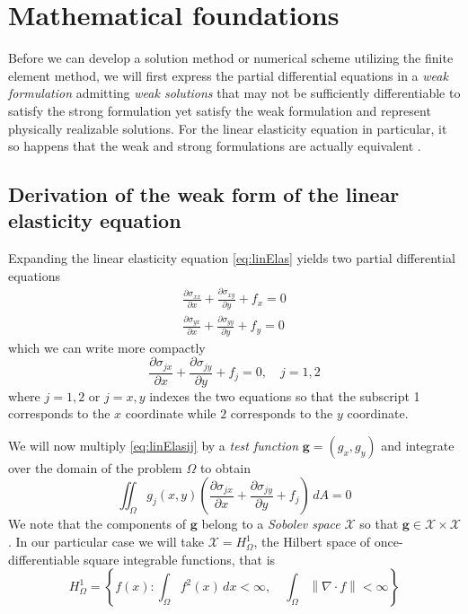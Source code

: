 \documentclass[11pt]{article}
\newcommand\p[2]{\frac{\partial #1}{\partial #2}}
\begin{document}
\section{Mathematical foundations}
Before we can develop a solution method or numerical scheme utilizing the finite element method, we will first express the partial differential equations in a \emph{weak formulation} admitting \emph{weak solutions} that may not be sufficiently differentiable to satisfy the strong formulation yet satisfy the weak formulation and represent physically realizable solutions. For the linear elasticity equation in particular, it so happens that the weak and strong formulations are actually equivalent \cite{Tchonkova011}.

\subsection{Derivation of the weak form of the linear elasticity equation}
Expanding the linear elasticity equation \eqref{eq:linElas} yields two partial differential equations
\begin{subequations}
\begin{gather}
  \p{\sigma_{xx}}{x} + \p{\sigma_{xy}}{y} + f_x = 0 \\
  \p{\sigma_{yx}}{x} + \p{\sigma_{yy}}{y} + f_y = 0
\end{gather}
\end{subequations}
which we can write more compactly
\begin{equation*} \label{eq:linElasij}
  \p{\sigma_{jx}}{x} + \p{\sigma_{jy}}{y} + f_j = 0, \quad j=1,2
\end{equation*}
where $j=1,2$ or $j=x,y$ indexes the two equations so that the subscript 1 corresponds to the $x$ coordinate while $2$ corresponds to the $y$ coordinate.

We will now multiply \eqref{eq:linElasij} by a \emph{test function} $\bm{g} = (g_x,g_y)$ and integrate over the domain of the problem $\Omega$ to obtain
\begin{equation*}
  \iint_\Omega g_j(x,y) \left( \p{\sigma_{jx}}{x} + \p{\sigma_{jy}}{y} + f_j \right) \, dA = 0
\end{equation*}
We note that the components of $\bm{g}$ belong to a \emph{Sobolev space} $\mathcal{X}$ so that $\bm{g} \in \mathcal{X}\times\mathcal{X}$. In our particular case we will take $\mathcal{X} = H^1_\Omega$, the Hilbert space of once-differentiable square integrable functions, that is
\begin{equation*}
  H^1_\Omega = \left\{ f(x) : \int_\Omega f^2(x) \, dx < \infty, \quad \int_\Omega \left\lVert \nabla\cdot f \right\rVert < \infty \right\}
\end{equation*}
\end{document}
